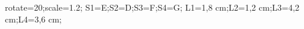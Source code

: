 \documentclass[exercice]{thedocument}%
\begin{document}
%
    \>rotate=20;\>scale=1.2;%
    \>S1=E;\>S2=D;\>S3=F;\>S4=G;%
    \>L1=1,8 cm;\>L2=1,2 cm;\>L3=4,2 cm;\>L4=3,6 cm;%
\end{document}
